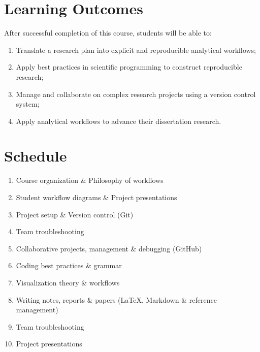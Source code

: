\documentclass[10pt]{article}
\begin{document}
\section*{Learning Outcomes}
After successful completion of this course, students will be able to:
\begin{enumerate}
	\itemsep0em 
	\item Translate a research plan into explicit and reproducible analytical workflows;
	\item Apply best practices in scientific programming to construct reproducible research;
	\item Manage and collaborate on complex research projects using a version control system;
	\item Apply analytical workflows to advance their dissertation research.
\end{enumerate}


\section*{Schedule}
\begin{enumerate}[label=\bfseries Week \arabic*:,leftmargin=*,labelindent=1em]
	\itemsep0em 
	\item Course organization \& Philosophy of workflows
	\item Student workflow diagrams \& Project presentations
	\item Project setup \& Version control (Git)
	\item Team troubleshooting
	\item Collaborative projects, management \& debugging (GitHub)
	\item Coding best practices \& grammar
	\item Visualization theory \& workflows
	\item Writing notes, reports \& papers (\LaTeX, Markdown \& reference management)
	\item Team troubleshooting
	\item Project presentations
\end{enumerate}
\end{document}
